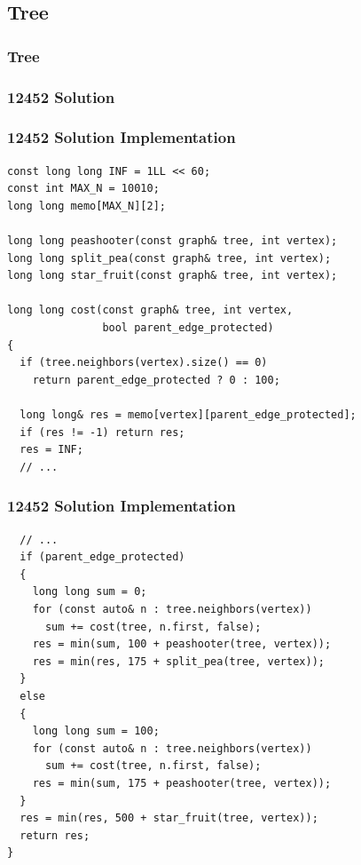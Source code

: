 \documentclass{beamer}
\newcommand{\uvalink}[2]{UVa Online Judge (http://uva.onlinejudge.org)
  problem number \href{#2}{\textcolor{blue}{#1}.}}
\newcounter{exo}
\newcommand{\exo}{
  \addtocounter{exo}{1}
  Exercice \arabic{exo}
}
\begin{document}
\fi



\subsection{Tree}

\begin{frame}%
\frametitle{Tree}

\end{frame}


\ifanswers

\begin{frame}%
\frametitle{12452 Solution}

\end{frame}

\begin{frame}[fragile]
\frametitle{12452 Solution Implementation}

\scriptsize
\begin{lstlisting}
const long long INF = 1LL << 60;
const int MAX_N = 10010;
long long memo[MAX_N][2];

long long peashooter(const graph& tree, int vertex);
long long split_pea(const graph& tree, int vertex);
long long star_fruit(const graph& tree, int vertex);

long long cost(const graph& tree, int vertex,
               bool parent_edge_protected)
{
  if (tree.neighbors(vertex).size() == 0)
    return parent_edge_protected ? 0 : 100;

  long long& res = memo[vertex][parent_edge_protected];
  if (res != -1) return res;
  res = INF;
  // ...
\end{lstlisting}

\end{frame}

\begin{frame}[fragile]
\frametitle{12452 Solution Implementation}

\scriptsize
\begin{lstlisting}
  // ...
  if (parent_edge_protected)
  {
    long long sum = 0;
    for (const auto& n : tree.neighbors(vertex))
      sum += cost(tree, n.first, false);
    res = min(sum, 100 + peashooter(tree, vertex));
    res = min(res, 175 + split_pea(tree, vertex));
  }
  else
  {
    long long sum = 100;
    for (const auto& n : tree.neighbors(vertex))
      sum += cost(tree, n.first, false);
    res = min(sum, 175 + peashooter(tree, vertex));
  }
  res = min(res, 500 + star_fruit(tree, vertex));
  return res;
}
\end{lstlisting}

\end{frame}
\end{document}
